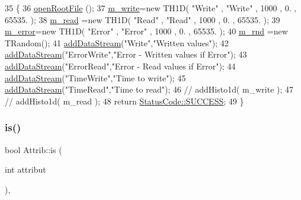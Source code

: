 \begin{DoxyCode}
35                                       \{
36   \hyperlink{classProcessus_aacf6812880c1d1a2bf14a4a39458f443}{openRootFile} ();
37   \hyperlink{classRegisterTest_a4e2dbc640871ece43a554425e2b73dcf}{m\_write}=\textcolor{keyword}{new} TH1D( \textcolor{stringliteral}{"Write"} , \textcolor{stringliteral}{"Write"} , 1000 , 0. , 65535. );
38   \hyperlink{classRegisterTest_a5bb74853c26fdf7223244c569c64eb6d}{m\_read} =\textcolor{keyword}{new} TH1D( \textcolor{stringliteral}{"Read"}  , \textcolor{stringliteral}{"Read"}  , 1000 , 0. , 65535. );
39   \hyperlink{classRegisterTest_a9b32a49463a1b1d319fde007607254f0}{m\_error}=\textcolor{keyword}{new} TH1D( \textcolor{stringliteral}{"Error"} , \textcolor{stringliteral}{"Error"} , 1000 , 0. , 65535. );
40   \hyperlink{classRegisterTest_a07e35817b07d61e54caa694d2a0fa210}{m\_rnd} =\textcolor{keyword}{new} TRandom();
41   \hyperlink{classProcessus_a308c8f193802f1d1ab49d4447d0cb281}{addDataStream}(\textcolor{stringliteral}{"Write"},\textcolor{stringliteral}{"Written values"});
42   \hyperlink{classProcessus_a308c8f193802f1d1ab49d4447d0cb281}{addDataStream}(\textcolor{stringliteral}{"ErrorWrite"},\textcolor{stringliteral}{"Error - Written values if Error"});
43   \hyperlink{classProcessus_a308c8f193802f1d1ab49d4447d0cb281}{addDataStream}(\textcolor{stringliteral}{"ErrorRead"},\textcolor{stringliteral}{"Error - Read values if Error"});
44   \hyperlink{classProcessus_a308c8f193802f1d1ab49d4447d0cb281}{addDataStream}(\textcolor{stringliteral}{"TimeWrite"},\textcolor{stringliteral}{"Time to write"});
45   \hyperlink{classProcessus_a308c8f193802f1d1ab49d4447d0cb281}{addDataStream}(\textcolor{stringliteral}{"TimeRead"},\textcolor{stringliteral}{"Time to read"});
46   \textcolor{comment}{//  addHisto1d( m\_write );}
47   \textcolor{comment}{//  addHisto1d( m\_read );}
48   \textcolor{keywordflow}{return} \hyperlink{classStatusCode_a6f565cbeadc76d14c72f047e5e85eb4badd0da38d3ba0d922efd1f4619bc37ad8}{StatusCode::SUCCESS};
49 \}
\end{DoxyCode}
\mbox{\label{classAttrib_a704f26af560909ad22065083bb7d4c34}} 
\subsubsection{\texorpdfstring{is()}{is()}}
{\footnotesize\ttfamily bool Attrib\+::is (\begin{DoxyParamCaption}\item[{int}]{attribut }\end{DoxyParamCaption})\hspace{0.3cm}{\ttfamily [inline]}, {\ttfamily [inherited]}}

